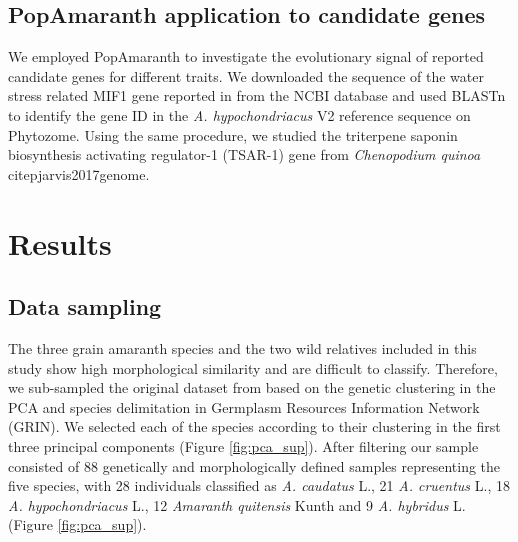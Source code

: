 \documentclass[9pt,twocolumn,twoside]{celabRxiv}
\begin{document}
 
\subsection{PopAmaranth application to candidate genes}
We employed PopAmaranth to investigate the evolutionary signal of reported candidate genes for different traits.
We downloaded the sequence of the water stress related MIF1 gene reported in \citet{huerta2011water} from the NCBI database and used BLASTn \citep{altschul1990basic} to identify the gene ID in the \textit{A. hypochondriacus} V2 reference sequence on Phytozome. 
Using the same procedure, we studied the triterpene saponin biosynthesis activating regulator-1 (TSAR-1) gene from \textit{Chenopodium quinoa} citep{jarvis2017genome}. 

 

\section{Results}
 
\subsection{Data sampling}

The three grain amaranth species and the two wild relatives included in this study show high morphological similarity \citep{sauer1967grain} and are difficult to classify.
Therefore, we sub-sampled the original dataset from \citet{stetter2020parallel} based on the genetic clustering in the PCA and species delimitation in Germplasm Resources Information Network (GRIN). 
We selected each of the species according to their clustering in the first three principal components (Figure \ref{fig:pca_sup}). 
After filtering our sample consisted of 88 genetically and morphologically defined samples representing the five species, with 28 individuals classified as \textit{A. caudatus} L., 21 \textit{A. cruentus} L., 18 \textit{A. hypochondriacus} L., 12 \textit{Amaranth quitensis} Kunth and 9 \textit{A. hybridus} L. (Figure \ref{fig:pca_sup}).
\end{document}
